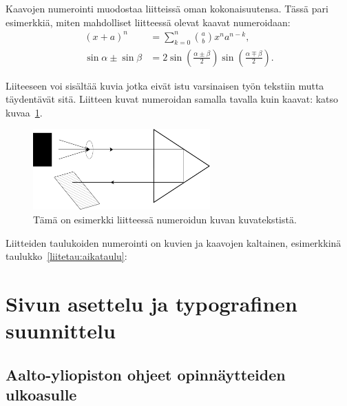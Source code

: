 \documentclass[finnish, 12pt, a4paper, elec, utf8, a-2b, online]{aaltothesis}
\begin{document}
Kaavojen numerointi muodostaa liitteissä oman kokonaisuutensa. Tässä pari 
esimerkkiä, miten mahdolliset liitteessä olevat kaavat numeroidaan:
\begin{align}
	(x+a)^n &= \sum_{k=0}^n \binom{a}{b} x^n a^{n-k}, \label{appeq:1}\\
	\sin\alpha \pm \sin\beta &= 2\sin\left(\frac{\alpha\pm\beta}{2}\right)
	\sin\left(\frac{\alpha\mp\beta}{2}\right). \label{liitekaava2}
\end{align}

Liiteeseen voi sisältää kuvia jotka eivät istu varsinaisen työn tekstiin mutta 
täydentävät sitä. Liitteen kuvat numeroidan samalla tavalla kuin kaavat: katso
kuvaa~\ref{liitekuv:taitto}.

\begin{figure}[b]
	\centering
	\includegraphics[height=31mm]{./linediagram.pdf}
	\caption{Tämä on esimerkki liitteessä numeroidun kuvan kuvatekstistä. 
		\label{liitekuv:taitto}}
\end{figure}

Liitteiden taulukoiden numerointi on kuvien ja kaavojen kaltainen, esimerkkinä taulukko~\ref{liitetau:aikataulu}:
\begin{table}[htb]
	\centering
	\caption{Taulukon kuvateksti. \label{liitetau:aikataulu}}
	\sffamily%
\end{table}


\clearpage
\section{Sivun asettelu ja typografinen suunnittelu}
\label{liite:asemointi}

\subsection*{Aalto-yliopiston ohjeet opinnäytteiden ulkoasulle}
\end{document}
